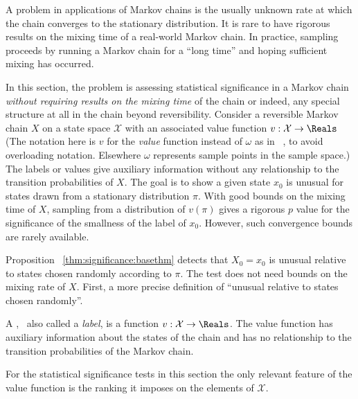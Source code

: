 \documentclass[12pt]{article}
\begin{document}
A problem in applications of Markov chains is the usually unknown rate
at which the chain converges to the stationary distribution.  It is rare
to have rigorous results on the mixing time of a real-world Markov
chain.  In practice, sampling proceeds by running a Markov chain for a
``long time'' and hoping sufficient mixing has occurred.

In this section, the problem is assessing statistical significance in a
Markov chain \emph{without requiring results on the mixing time} of the
chain or indeed, any special structure at all in the chain beyond
reversibility.  Consider a reversible Markov chain \( X \) on a state
space \( \mathcal{X} \) with an associated value function \( v :
\mathcal{X} \to \Reals \) (The notation here is \( v \) for the \emph{value}
function instead of \( \omega \) as in~%
\cite{Chikina2860}, to avoid overloading notation.  Elsewhere \( \omega \)
represents sample points in the sample space.) The labels or values give
auxiliary information without  any relationship to the
transition probabilities of \( X \).  The goal is to show a given state \(
x_0 \) is unusual for states drawn from a stationary distribution \( \pi
\).  With good bounds on the mixing time of \( X \), sampling from a
distribution of \( v(\pi) \) gives a rigorous \( p \) value for the
significance of the smallness of the label of \( x_0 \). However, such
convergence bounds are rarely available.

Proposition~%
\ref{thm:significance:basethm} detects that \( X_0 = x_0 \) is unusual
relative to states chosen randomly according to \( \pi \).  The test
does not need bounds on the mixing rate of \( X \).  First, a more
precise definition of ``unusual relative to states chosen randomly''.

\begin{definition}
    A ,~%
    also called a \emph{label}, is a function \( v :  \mathcal{X} \to
    \Reals \).  The value function has auxiliary information about the
    states of the chain and has no relationship to the transition
    probabilities of the Markov chain.
\end{definition}

\begin{remark}
    For the statistical significance tests in this section the only
    relevant feature of the value function is the ranking it imposes on
    the elements of \( \mathcal{X} \).
\end{remark}
\end{document}
